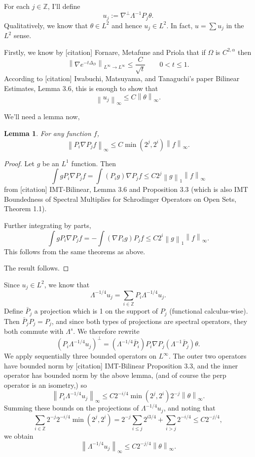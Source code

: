 \documentclass[11pt]{amsart}
\newtheorem{lemma}[theorem]{Lemma}
\theoremstyle{remark}
\newcommand{\Z}{\mathbb{Z}}
\newcommand{\norm}[1]{\left\lVert#1\right\rVert}
\newcommand{\paren}[1]{\left( #1 \right)}
\newcommand{\grad}{\nabla}
\newcommand{\Laplace}{\Delta}
\begin{document}
For each $j \in \Z$, I'll define
\[ u_j := \grad^\perp \Lambda^{-1} P_j \theta. \]
Qualitatively, we know that $\theta \in L^2$ and hence $u_j \in L^2$.  In fact, $u = \sum u_j$ in the $L^2$ sense.  

Firstly, we know by [citation] Fornare, Metafune and Priola that if $\Omega$ is $C^{2,\alpha}$ then
\[ \norm{\grad e^{-t\Laplace_D}}_{L^\infty \to L^\infty} \leq \frac{C}{\sqrt{t}} \qquad 0 < t \leq 1. \]
According to [citation] Iwabuchi, Matsuyama, and Tanaguchi's paper Bilinear Estimates, Lemma 3.6, this is enough to show that
\[ \norm{u_j}_\infty \leq C \norm{\theta}_\infty. \]

We'll need a lemma now,
\begin{lemma}
For any function $f$,
\[ \norm{P_i \grad P_j f}_\infty \leq C \min(2^j,2^i) \norm{f}_\infty. \]
\end{lemma}
\begin{proof}
Let $g$ be an $L^1$ function.  Then
\[ \int g P_i \grad P_j f = \int (P_i g) \grad P_j f \leq C 2^j \norm{g}_1 \norm{f}_\infty \]
from [citation] IMT-Bilinear, Lemma 3.6 and Proposition 3.3 (which is also IMT Boundedness of Spectral Multiplies for Schrodinger Operators on Open Sets, Theorem 1.1).  

Further integrating by parts,
\[ \int g P_i \grad P_j f = - \int (\grad P_i g) P_j f \leq C 2^i \norm{g}_1 \norm{f}_\infty. \]
This follows from the same theorems as above.  

The result follows.  
\end{proof}

Since $u_j \in L^2$, we know that
\[ \Lambda^{-1/4} u_j = \sum_{i \in \Z} P_i \Lambda^{-1/4} u_j. \]
Define $\bar{P}_j$ a projection which is 1 on the support of $P_j$ (functional calculus-wise).  Then $\bar{P}_j P_j = P_j$, and since both types of projections are spectral operators, they both commute with $\Lambda^s$.  We therefore rewrite
\[ \paren{P_i \Lambda^{-1/4} u_j}^\perp = \paren{\Lambda^{-1/4} \bar{P}_i} P_i \grad P_j \paren{\Lambda^{-1} \bar{P}_j} \theta. \]
We apply sequentially three bounded operators on $L^\infty$.  The outer two operators have bounded norm by [citation] IMT-Bilinear Proposition 3.3, and the inner operator has bounded norm by the above lemma, (and of course the perp operator is an isometry,) so 
\[ \norm{ P_i \Lambda^{-1/4} u_j}_\infty \leq C 2^{-i/4} \min(2^j, 2^i) 2^{-j} \norm{\theta}_\infty. \]
%
Summing these bounds on the projections of $\Lambda^{-1/4} u_j$, and noting that
\[ \sum_{i \in \Z} 2^{-j} 2^{-i/4} \min(2^j,2^i) = 2^{-j} \sum_{i \leq j} 2^{i 3/4} + \sum_{i>j} 2^{-i/4} \leq C 2^{-j/4}, \]
we obtain
\[ \norm{\Lambda^{-1/4} u_j}_\infty \leq C 2^{-j/4} \norm{\theta}_\infty. \]
\end{document}
